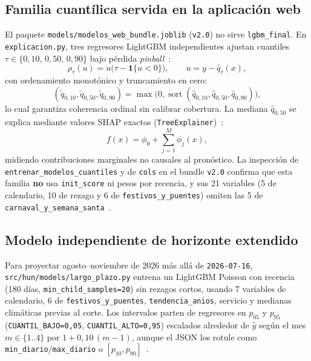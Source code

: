 \subsection{Familia cuantílica servida en la aplicación web}

El paquete \texttt{models/modelos\_web\_bundle.joblib} (\texttt{v2.0}) no sirve \texttt{lgbm\_final}. En \texttt{explicacion.py}, tres regresores LightGBM independientes ajustan cuantiles $\tau \in \{0{,}10,\, 0{,}50,\, 0{,}90\}$ bajo pérdida \textit{pinball}~\cite{koenker1978quantiles,ke2017lightgbm}:
\begin{equation}
\label{eq:pinball}
\rho_\tau(u) = u\bigl(\tau - \mathbf{1}\{u < 0\}\bigr), \qquad u = y - \hat{q}_\tau(x),
\end{equation}
con ordenamiento monotónico y truncamiento en cero:
\begin{equation}
\label{eq:orden_cuantiles}
(\tilde{q}_{0{,}10}, \tilde{q}_{0{,}50}, \tilde{q}_{0{,}90}) = \max\bigl(0,\operatorname{sort}(\hat{q}_{0{,}10}, \hat{q}_{0{,}50}, \hat{q}_{0{,}90})\bigr),
\end{equation}
lo cual garantiza coherencia ordinal sin calibrar cobertura. La mediana $\hat{q}_{0{,}50}$ se explica mediante valores SHAP exactos (\texttt{TreeExplainer})~\cite{lundberg2017shap}:
\begin{equation}
\label{eq:shap}
f(x) = \phi_0 + \sum_{j=1}^{M} \phi_j(x),
\end{equation}
midiendo contribuciones marginales no causales al pronóstico. La inspección de \texttt{entrenar\_modelos\_cuantiles} y de \texttt{cols} en el bundle \texttt{v2.0} confirma que esta familia \textbf{no} usa \texttt{init\_score} ni pesos por recencia, y sus 21 variables (5 de calendario, 10 de rezago y 6 de \texttt{festivos\_y\_puentes}) omiten las 5 de \texttt{carnaval\_y\_semana\_santa}~\cite{mediflow2026bundle}.

\subsection{Modelo independiente de horizonte extendido}

Para proyectar agosto--noviembre de 2026 más allá de \texttt{2026-07-16}, \texttt{src/hun/models/largo\_plazo.py} entrena un LightGBM Poisson con recencia (180 días, \texttt{min\_child\_samples=20}) sin rezagos cortos, usando 7 variables de calendario, 6 de \texttt{festivos\_y\_puentes}, \texttt{tendencia\_anios}, servicio y medianas climáticas previas al corte. Los intervalos parten de regresores en $p_{05}$ y $p_{95}$ (\texttt{CUANTIL\_BAJO=0,05}, \texttt{CUANTIL\_ALTO=0,95}) escalados alrededor de $\hat{y}$ según el mes $m \in \{1..4\}$ por $1 + 0{,}10\,(m-1)$, aunque el JSON los rotule como \texttt{min\_diario}/\texttt{max\_diario} o $[p_{10}, p_{90}]$~\cite{mediflow2026largoplazo}.
